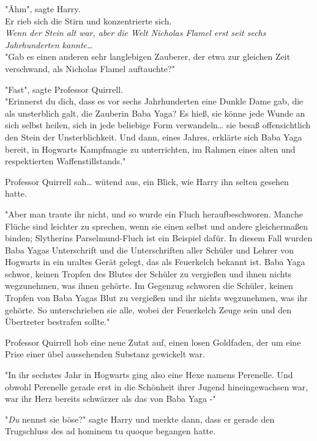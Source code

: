 {"Ähm", sagte Harry.\\ Er rieb sich die Stirn und konzentrierte sich.\\ \emph{Wenn der Stein alt war, aber die Welt Nicholas Flamel erst seit sechs Jahrhunderten kannte…}\\ "Gab es einen anderen sehr langlebigen Zauberer, der etwa zur gleichen Zeit verschwand, als Nicholas Flamel auftauchte?"

"Fast", sagte Professor Quirrell.\\ "Erinnerst du dich, dass es vor sechs Jahrhunderten eine Dunkle Dame gab, die als unsterblich galt, die Zauberin Baba Yaga? Es hieß, sie könne jede Wunde an sich selbst heilen, sich in jede beliebige Form verwandeln… sie besaß offensichtlich den Stein der Unsterblichkeit. Und dann, eines Jahres, erklärte sich Baba Yaga bereit, in Hogwarts Kampfmagie zu unterrichten, im Rahmen eines alten und respektierten Waffenstillstands."

Professor Quirrell sah… wütend aus, ein Blick, wie Harry ihn selten gesehen hatte.

"Aber man traute ihr nicht, und so wurde ein Fluch heraufbeschworen. Manche Flüche sind leichter zu sprechen, wenn sie einen selbst und andere gleichermaßen binden; Slytherins Parselmund-Fluch ist ein Beispiel dafür. In diesem Fall wurden Baba Yagas Unterschrift und die Unterschriften aller Schüler und Lehrer von Hogwarts in ein uraltes Gerät gelegt, das als Feuerkelch bekannt ist. Baba Yaga schwor, keinen Tropfen des Blutes der Schüler zu vergießen und ihnen nichts wegzunehmen, was ihnen gehörte. Im Gegenzug schworen die Schüler, keinen Tropfen von Baba Yagas Blut zu vergießen und ihr nichts wegzunehmen, was ihr gehörte. So unterschrieben sie alle, wobei der Feuerkelch Zeuge sein und den Übertreter bestrafen sollte."

Professor Quirrell hob eine neue Zutat auf, einen losen Goldfaden, der um eine Prise einer übel aussehenden Substanz gewickelt war.

"In ihr sechstes Jahr in Hogwarts ging also eine Hexe namens Perenelle. Und obwohl Perenelle gerade erst in die Schönheit ihrer Jugend hineingewachsen war, war ihr Herz bereits schwärzer als das von Baba Yaga -"

"\emph{Du} nennst sie böse?" sagte Harry und merkte dann, dass er gerade den Trugschluss des ad hominem tu quoque begangen hatte.

}
